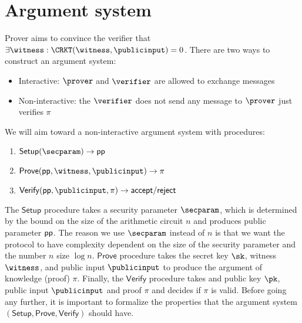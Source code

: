 \section{Argument system}
Prover aims to convince the verifier that $\exists \witness: \CRKT(\witness, \publicinput) = 0$. There are two ways to construct an argument system:
\begin{itemize}
    \item Interactive: $\prover$ and $\verifier$ are allowed to exchange messages
    \item Non-interactive: the $\verifier$ does not send any message to $\prover$ just verifies $\pi$
\end{itemize}

We will aim toward a non-interactive argument system with procedures:
\begin{enumerate}
    \item $\mathsf{Setup}(\secparam) \rightarrow \publicparameter$
    \item $\mathsf{Prove}(\publicparameter, \witness, \publicinput) \rightarrow \pi$
    \item $\mathsf{Verify}(\publicparameter, \publicinput, \pi) \rightarrow \mathsf{accept}/\mathsf{reject}$
\end{enumerate}

The $\mathsf{Setup}$ procedure takes a security parameter $\secparam$, which is determined by the bound on the size of the arithmetic circuit $n$ and produces public parameter $\mathsf{pp}$. The reason we use $\secparam$ instead of $n$ is that we want the protocol to have complexity dependent on the size of the security parameter and the number $n$ size $\log{n}$. $\mathsf{Prove}$ procedure takes the secret key $\sk$, witness $\witness$, and public input $\publicinput$ to produce the argument of knowledge (proof) $\pi$. Finally, the $\mathsf{Verify}$ procedure takes and public key $\pk$, public input $\publicinput$ and proof $\pi$ and decides if $\pi$ is valid. Before going any further, it is important to formalize the properties that the argument system $(\mathsf{Setup},\mathsf{Prove}, \mathsf{Verify})$ should have. 

